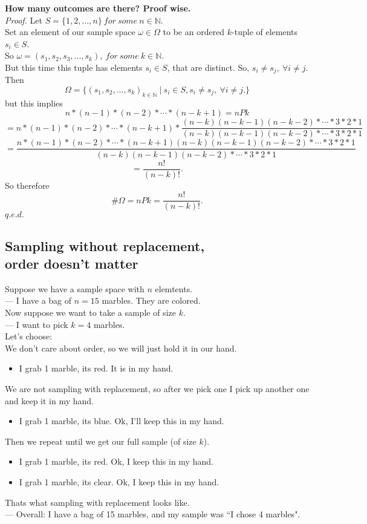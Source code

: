 \documentclass[12pt]{book}
\begin{document}
\noindent \textbf{How many outcomes are there? Proof wise.}\\
\textit{Proof.}
Let $S=\{1,2,...,n\}~for~some~n\in \mathbb{N}$.\\
Set an element of our sample space $\omega \in \Omega$ to be an ordered $k$-tuple of elements $s_i \in S$.\\
So $\omega = (s_1, s_2, s_3,..., s_k), ~for~some~k\in \mathbb{N}$.\\
But this time this tuple has elements $s_i\in S$,  that are distinct. So, $s_i \neq s_j, ~\forall i\neq j.$\\
Then \\
$$\Omega = \big\{ (s_1, s_2, ..., s_k)_{k\in \mathbb{N}} ~\big|~ s_i \in S, s_i \neq s_j, ~\forall i\neq j. \big\}$$
but this implies
$$n*(n-1)*(n-2)* \cdots *(n-k+1) = nPk$$
$$\textstyle =n*(n-1)*(n-2)* \cdots *(n-k+1)*\frac{(n-k)(n-k-1)(n-k-2) *\cdots *3*2*1}{(n-k)(n-k-1)(n-k-2) *\cdots *3*2*1}$$
$$\textstyle =\frac{n*(n-1)*(n-2)* \cdots *(n-k+1)(n-k)(n-k-1)(n-k-2) *\cdots *3*2*1}{(n-k)(n-k-1)(n-k-2) *\cdots *3*2*1}$$
$$=\frac{n!}{(n-k)!}.$$
So therefore
$$ \#\Omega = nPk = \frac{n!}{(n-k)!}.$$\hfill$q.e.d.$




\subsection{Sampling without replacement, \\ order doesn't matter}
Suppose we have a sample space with $n$ elemtents. \\
--- I have a bag of $n=15$ marbles. They are colored.\\
Now suppose we want to take a sample of size $k$. \\
--- I want to pick $k=4$ marbles.\\

\noindent Let's choose: \\
We don't care about order, so we will just hold it in our hand.
\begin{itemize}
\item I grab 1 marble, its red. It is in my hand.
\end{itemize}
We are not sampling with replacement, so after we pick one I pick up another one and keep it in my hand.
\begin{itemize}
\item I grab 1 marble, its blue. Ok, I'll keep this in my hand.
\end{itemize}
Then we repeat until we get our full sample (of size $k$). 
\begin{itemize}
\item I grab 1 marble, its red. Ok, I keep this in my hand.
\item I grab 1 marble, its clear. Ok, I keep this in my hand.
\end{itemize}
Thats what sampling with replacement looks like. \\
--- Overall: I have a bag of 15 marbles, and my sample was ``I chose 4 marbles". 
\end{document}
